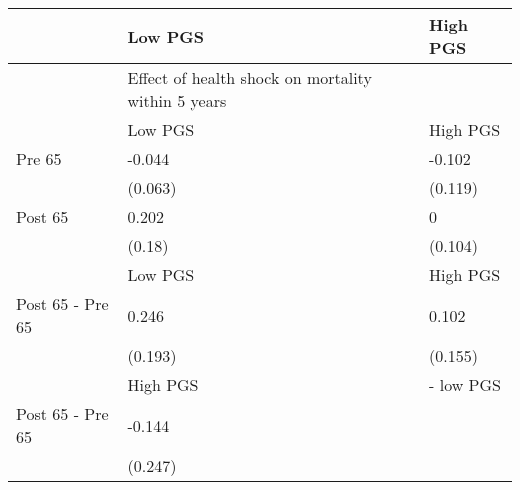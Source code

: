% 
\begin{tabular}{lll}
  \hline
 & Low PGS & High PGS \\ 
  \hline
 & Effect of health shock on mortality within 5 years &  \\ 
   & Low PGS & High PGS \\ 
  Pre 65 & -0.044 & -0.102 \\ 
   & (0.063) & (0.119) \\ 
  Post 65 & 0.202 & 0 \\ 
   & (0.18) & (0.104) \\ 
   & Low PGS & High PGS \\ 
  Post 65 - Pre 65 & 0.246 & 0.102 \\ 
   & (0.193) & (0.155) \\ 
   & High PGS  & - low PGS \\ 
  Post 65 - Pre 65 & -0.144 &  \\ 
   & (0.247) &  \\ 
   \hline
\end{tabular}
